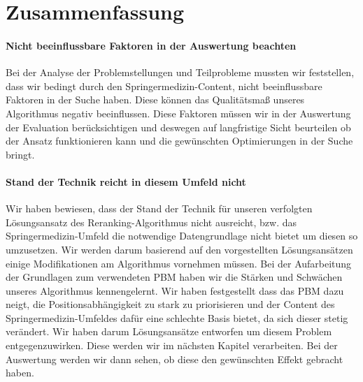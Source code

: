 \section{Zusammenfassung}
\label{sec:Grundlagen:Zusammenfassung}

\paragraph{Nicht beeinflussbare Faktoren in der Auswertung beachten}
Bei der Analyse der Problemstellungen und Teilprobleme mussten wir feststellen, dass wir bedingt durch den Springermedizin-Content, nicht beeinflussbare Faktoren in der Suche haben. Diese können das Qualitätsmaß unseres Algorithmus negativ beeinflussen. Diese Faktoren müssen wir in der Auswertung der Evaluation berücksichtigen und deswegen auf langfristige Sicht beurteilen ob der Ansatz funktionieren kann und die gewünschten Optimierungen in der Suche bringt. 

\paragraph{Stand der Technik reicht in diesem Umfeld nicht}
Wir haben bewiesen, dass der Stand der Technik für unseren verfolgten Lösungsansatz des Reranking-Algorithmus nicht ausreicht, bzw. das Springermedizin-Umfeld die notwendige Datengrundlage nicht bietet um diesen so umzusetzen. Wir werden darum basierend auf den vorgestellten Lösungsansätzen einige Modifikationen am Algorithmus vornehmen müssen. Bei der Aufarbeitung der Grundlagen zum verwendeten PBM haben wir die Stärken und Schwächen unseres Algorithmus kennengelernt. Wir haben festgestellt dass das PBM dazu neigt, die Positionsabhängigkeit zu stark zu priorisieren und der Content des Springermedizin-Umfeldes dafür eine schlechte Basis bietet, da sich dieser stetig verändert. Wir haben darum Lösungsansätze entworfen um diesem Problem entgegenzuwirken. Diese werden wir im nächsten Kapitel verarbeiten. Bei der Auswertung werden wir dann sehen, ob diese den gewünschten Effekt gebracht haben. 
